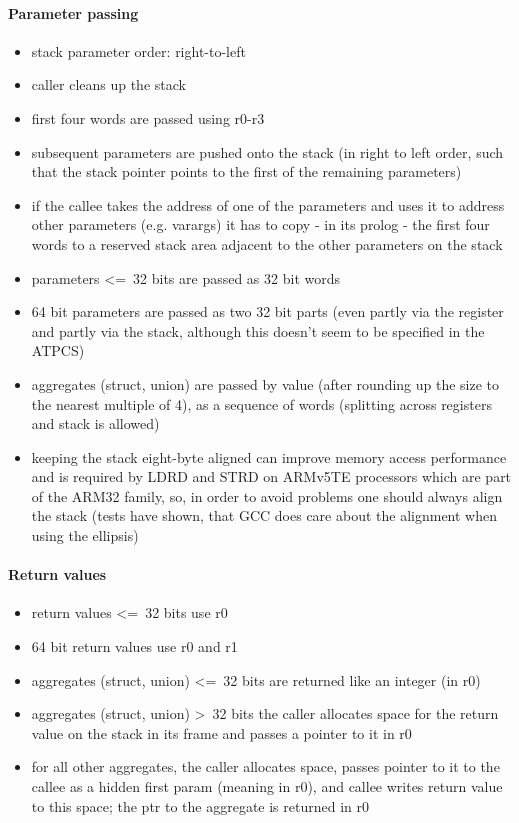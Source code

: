 \paragraph{Parameter passing}

\begin{itemize}
\item stack parameter order: right-to-left
\item caller cleans up the stack
\item first four words are passed using r0-r3
\item subsequent parameters are pushed onto the stack (in right to left order, such that the stack pointer points to the first of the remaining parameters)
\item if the callee takes the address of one of the parameters and uses it to address other parameters (e.g. varargs) it has to copy - in its prolog - the first four words to a reserved stack area adjacent to the other parameters on the stack
\item parameters \textless=\ 32 bits are passed as 32 bit words
\item 64 bit parameters are passed as two 32 bit parts (even partly via the register and partly via the stack, although this doesn't seem to be specified in the ATPCS)
\item aggregates (struct, union) are passed by value (after rounding up the size to the nearest multiple of 4), as a sequence of words (splitting across registers and stack is allowed)
\item keeping the stack eight-byte aligned can improve memory access performance and is required by LDRD and STRD on ARMv5TE processors which are part of the ARM32 family, so, in order to avoid problems one should always align the stack (tests have shown, that GCC does care about the alignment when using the ellipsis)
\end{itemize}

\paragraph{Return values}

\begin{itemize}
\item return values \textless=\ 32 bits use r0
\item 64 bit return values use r0 and r1
\item aggregates (struct, union) \textless=\ 32 bits are returned like an integer (in r0)
\item aggregates (struct, union) \textgreater\ 32 bits the caller allocates space for the return value on the stack in its frame and passes a pointer to it in r0
\item for all other aggregates, the caller allocates space, passes pointer to it to the callee as a hidden first param (meaning in r0), and callee writes return value to this space; the ptr to the aggregate is returned in r0
\end{itemize}


